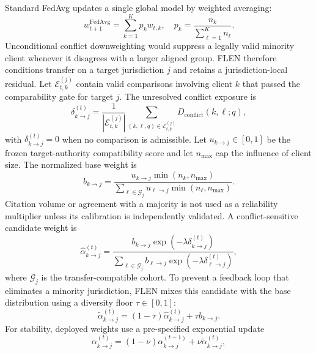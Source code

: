 \documentclass[preprint,12pt,authoryear]{elsarticle}
\begin{document}
Standard FedAvg updates a single global model by weighted averaging:
\begin{equation}
    w_{t+1}^{\mathrm{FedAvg}} = \sum_{k=1}^{K}p_k w_{t,k},
    \quad p_k=\frac{n_k}{\sum_{\ell=1}^{K}n_\ell}.
\end{equation}
Unconditional conflict downweighting would suppress a legally valid minority client whenever it disagrees with a larger aligned group. FLEN therefore conditions transfer on a target jurisdiction $j$ and retains a jurisdiction-local residual. Let $\mathcal{E}_{t,k}^{(j)}$ contain valid comparisons involving client $k$ that passed the comparability gate for target $j$. The unresolved conflict exposure is
\begin{equation}
    \delta_{k\rightarrow j}^{(t)} =
    \frac{1}{|\mathcal{E}_{t,k}^{(j)}|}
    \sum_{(k,\ell,q)\in\mathcal{E}_{t,k}^{(j)}}
    D_{\mathrm{conflict}}(k,\ell;q),
\end{equation}
with $\delta_{k\rightarrow j}^{(t)}=0$ when no comparison is admissible. Let $u_{k\rightarrow j}\in[0,1]$ be the frozen target-authority compatibility score and let $n_{\max}$ cap the influence of client size. The normalized base weight is
\begin{equation}
    b_{k\rightarrow j}=
    \frac{u_{k\rightarrow j}\min(n_k,n_{\max})}
    {\sum_{\ell\in\mathcal{G}_j}u_{\ell\rightarrow j}\min(n_\ell,n_{\max})}.
\end{equation}
Citation volume or agreement with a majority is not used as a reliability multiplier unless its calibration is independently validated. A conflict-sensitive candidate weight is
\begin{equation}
    \widehat{\alpha}_{k\rightarrow j}^{(t)} =
    \frac{b_{k\rightarrow j}\exp(-\lambda \delta_{k\rightarrow j}^{(t)})}
    {\sum_{\ell\in\mathcal{G}_j}b_{\ell\rightarrow j}
    \exp(-\lambda \delta_{\ell\rightarrow j}^{(t)})},
\end{equation}
where $\mathcal{G}_j$ is the transfer-compatible cohort. To prevent a feedback loop that eliminates a minority jurisdiction, FLEN mixes this candidate with the base distribution using a diversity floor $\tau\in[0,1]$:
\begin{equation}
    \widetilde{\alpha}_{k\rightarrow j}^{(t)} =
    (1-\tau)\widehat{\alpha}_{k\rightarrow j}^{(t)}
    + \tau b_{k\rightarrow j}.
\end{equation}
For stability, deployed weights use a pre-specified exponential update
\begin{equation}
    \alpha_{k\rightarrow j}^{(t)}=
    (1-\nu)\alpha_{k\rightarrow j}^{(t-1)}
    +\nu\widetilde{\alpha}_{k\rightarrow j}^{(t)},
\end{equation}
\end{document}

